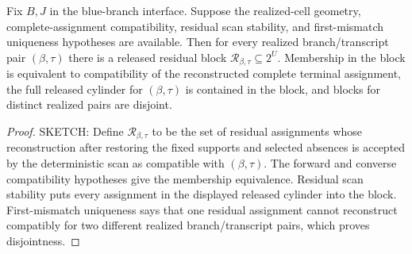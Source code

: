 \begin{helper}
Fix \(B,J\) in the blue-branch interface.  Suppose the realized-cell
geometry, complete-assignment compatibility, residual scan stability, and
first-mismatch uniqueness hypotheses are available.  Then for every realized
branch/transcript pair \((\beta,\tau)\) there is a released residual block
\(\mathcal R_{\beta,\tau}\subseteq 2^U\).  Membership in the block is
equivalent to compatibility of the reconstructed complete terminal
assignment, the full released cylinder for \((\beta,\tau)\) is contained in
the block, and blocks for distinct realized pairs are disjoint.
\end{helper}
\begin{proof}
SKETCH:
Define \(\mathcal R_{\beta,\tau}\) to be the set of residual assignments
whose reconstruction after restoring the fixed supports and selected
absences is accepted by the deterministic scan as compatible with
\((\beta,\tau)\).  The forward and converse compatibility hypotheses give the
membership equivalence.  Residual scan stability puts every assignment in the
displayed released cylinder into the block.  First-mismatch uniqueness says
that one residual assignment cannot reconstruct compatibly for two different
realized branch/transcript pairs, which proves disjointness.
\end{proof}
